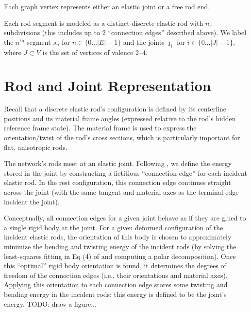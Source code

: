 \documentclass[10pt]{article}
\def\segment{s}
\def\joint{\jmath}
\begin{document}
Each graph vertex represents either an elastic joint or a free rod end.

Each rod segment is modeled as a distinct discrete elastic rod with $n_s$
subdivisions (this includes up to 2 ``connection edges'' described above). We
label the $n^\text{th}$ segment $\segment_n$ for $n \in \{0\dots|E| - 1\}$ and
the joints $\joint_i$ for $i \in \{0\dots|J| - 1\}$, where $J \subset V$ is the
set of vertices of valence $2\text{--}4$.

\section{Rod and Joint Representation}
Recall that a discrete elastic rod's configuration is defined by its centerline positions
and its material frame angles (expressed relative to the rod's hidden reference
frame state). The material frame is used to express the orientation/twist of
the rod's cross sections, which is particularly important for flat, anisotropic
rods.

The network's rods meet at an elastic joint. Following \cite{Perez2015}, we define the
energy stored in the joint by constructing a fictitious ``connection edge'' for each incident elastic rod.
In the rest configuration, this connection edge continues straight across the joint (with the same tangent
and material axes as the terminal edge incident the joint).

Conceptually, all connection edges for a given joint behave as if they are
glued to a single rigid body at the joint. For a given deformed configuration
of the incident elastic rods, the orientation of this body is chosen to
approximately minimize the bending and twisting energy of the incident rods (by
solving the least-squares fitting in Eq (4) of \cite{Perez2015} and computing a
polar decomposition). Once this ``optimal'' rigid body orientation is found, it
determines the degrees of freedom of the connection edges (i.e., their
orientations and material axes). Applying this orientation to each connection
edge stores some twisting and bending energy in the incident rods; this energy
is defined to be the joint's energy.
TODO: draw a figure...
\end{document}
